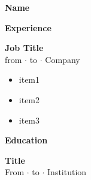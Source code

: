 \documentclass[11pt, a4paper]{article}
\newcommand{\name}{Name}
\newcommand{\phone}{}
\newcommand{\aboutme}{}
\newcommand{\leftsideratio}{0.33} %
\newcommand{\margins}{1.5em} %
\newcommand{\rightsidetextpadding}{3em} %
\newcommand{\CVItem}[4]{%
\textbf{#1}\\
{\color{rightsidetext2} #2 $\cdot$ #3 $\cdot$ #4}
}
\begin{document}
\colorbox{debugyellow}{%
\begin{minipage}[\textheight]{\textwidth-\leftsideratio\textwidth}%
    \begin{center}%
    \vspace{\margins}%
    \colorbox{debuggreen}{%
    \color{rightsidetext}
    \begin{minipage}[t][\textheight-\margins]{0.9\textwidth}%
    	\vspace{\margins}%
    	\begin{flushleft}%
    		{\Huge \color{rightsideaccent} \selectfont \textbf{\name}}
    	\end{flushleft}

    	\ifthenelse{\not\equal{\phone}{}}{%

    	\bigskip

    	\textit{\aboutme}
    	}{}

    	\vspace{\rightsidetextpadding}


    	{\LARGE \color{rightsideaccent} \selectfont \textbf{Experience}}

    	\bigskip

		\CVItem{Job Title}{from}{to}{Company}

		\begin{itemize}
 			\item item1
 			\item item2
 			\item item3
 		\end{itemize}

    	\vspace{\rightsidetextpadding}


    	{\LARGE \color{rightsideaccent} \selectfont \textbf{Education}}

		\bigskip

		\CVItem{Title}{From}{to}{Institution}\\

    \end{minipage}
    }
    \end{center}
\end{minipage}
}
\end{document}

